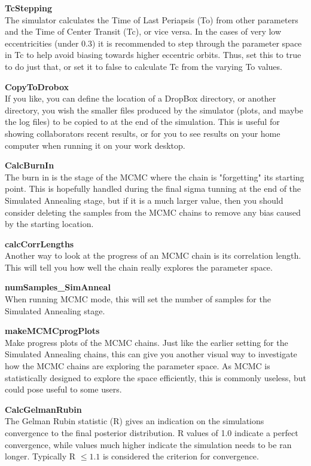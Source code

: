 \documentclass[12pt,preprint]{aastex}
\begin{document}
{\bf TcStepping}\\
The simulator calculates the Time of Last Periapsis (To) from other parameters and the Time of Center Transit (Tc), or vice versa.  In the cases of very low eccentricities (under 0.3) it is recommended to step through the parameter space in Tc to help avoid biasing towards higher eccentric orbits.  Thus, set this to true to do just that, or set it to false to calculate Tc from the varying To values.

{\bf CopyToDrobox}\\
If you like, you can define the location of a DropBox directory, or another directory, you wish the smaller files produced by the simulator (plots, and maybe the log files) to be copied to at the end of the simulation.  This is useful for showing collaborators recent results, or for you to see results on your home computer when running it on your work desktop.

{\bf CalcBurnIn}\\
The burn in is the stage of the MCMC where the chain is "forgetting" its starting point.  This is hopefully handled during the final sigma tunning at the end of the Simulated Annealing stage, but if it is a much larger value, then you should consider deleting the samples from the MCMC chains to remove any bias caused by the starting location.

{\bf calcCorrLengths}\\
Another way to look at the progress of an MCMC chain is its correlation length.  This will tell you how well the chain really explores the parameter space.

{\bf numSamples\_SimAnneal}\\
When running MCMC mode, this will set the number of samples for the Simulated Annealing stage.

{\bf makeMCMCprogPlots}\\
Make progress plots of the MCMC chains.  Just like the earlier setting for the Simulated Annealing chains, this can give you another visual way to investigate how the MCMC chains are exploring the parameter space.  As MCMC is statistically designed to explore the space efficiently, this is commonly useless, but could pose useful to some users.

{\bf CalcGelmanRubin}\\
The Gelman Rubin statistic (R) gives an indication on the simulations convergence to the final posterior distribution.  R values of 1.0 indicate a perfect convergence, while values much higher indicate the simulation needs to be ran longer.  Typically R $\leq1.1$ is considered the criterion for convergence.
\end{document}
